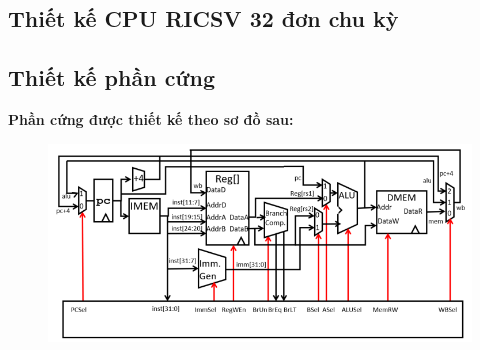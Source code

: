 \documentclass[E:/Latex/ExtraWork/ComputerArchitechture/Report.tex]{subfiles}
\begin{document}
	\begin{otherlanguage}{english}
		\chapter{Thiết kế CPU RICSV 32 đơn chu kỳ}
			\section{Thiết kế phần cứng}
				\textbf {Phần cứng được thiết kế theo sơ đồ sau:}
					\begin{figure}[h!]
						\includegraphics[scale = 0.9]{Figure/Fig1.png}
						\centering
					\end{figure}



\end{otherlanguage}
\end{document}
